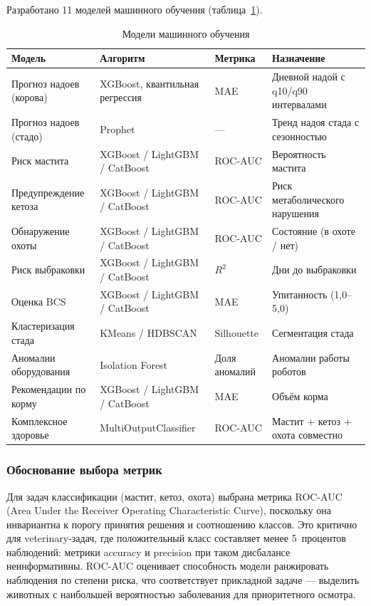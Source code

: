 Разработано 11 моделей машинного обучения (таблица~\ref{mlmodels}).

\begin{table}
  \caption{Модели машинного обучения}
  \small
  \begin{tabularx}{\textwidth}{|p{3.2cm}|p{2.8cm}|l|X|}
    \hline
    \textbf{Модель} & \textbf{Алгоритм} & \textbf{Метрика} & \textbf{Назначение} \\
    \hline
    Прогноз надоев (корова) & XGBoost, квантильная регрессия & MAE & Дневной надой с q10/q90 интервалами \\
    \hline
    Прогноз надоев (стадо) & Prophet & --- & Тренд надоя стада с сезонностью \\
    \hline
    Риск мастита & XGBoost / LightGBM / CatBoost & ROC-AUC & Вероятность мастита \\
    \hline
    Предупреждение кетоза & XGBoost / LightGBM / CatBoost & ROC-AUC & Риск метаболического нарушения \\
    \hline
    Обнаружение охоты & XGBoost / LightGBM / CatBoost & ROC-AUC & Состояние (в охоте / нет) \\
    \hline
    Риск выбраковки & XGBoost / LightGBM / CatBoost & $R^2$ & Дни до выбраковки \\
    \hline
    Оценка BCS & XGBoost / LightGBM / CatBoost & MAE & Упитанность (1,0--5,0) \\
    \hline
    Кластеризация стада & KMeans / HDBSCAN & Silhouette & Сегментация стада \\
    \hline
    Аномалии оборудования & Isolation Forest & Доля аномалий & Аномалии работы роботов \\
    \hline
    Рекомендации по корму & XGBoost / LightGBM / CatBoost & MAE & Объём корма \\
    \hline
    Комплексное здоровье & MultiOutput\newline Classifier & ROC-AUC & Мастит + кетоз + охота совместно \\
    \hline
  \end{tabularx}
  \label{mlmodels}
\end{table}

\subsubsection{Обоснование выбора метрик}

Для задач классификации (мастит, кетоз, охота) выбрана метрика ROC-AUC (Area Under the Receiver Operating Characteristic Curve), поскольку она инвариантна к порогу принятия решения и соотношению классов. Это критично для veterinary-задач, где положительный класс составляет менее 5~процентов наблюдений: метрики accuracy и precision при таком дисбалансе неинформативны. ROC-AUC оценивает способность модели ранжировать наблюдения по степени риска, что соответствует прикладной задаче --- выделить животных с наибольшей вероятностью заболевания для приоритетного осмотра.

